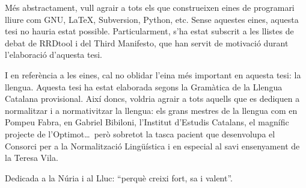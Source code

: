 Més abstractament, vull agrair a tots els que construeixen eines de
programari lliure com GNU, \LaTeX, Subversion, Python, etc. Sense
aquestes eines, aquesta tesi no hauria estat possible.
Particularment, s'ha estat subscrit a les llistes de debat de RRDtool
i del Third Manifesto, que han servit de motivació durant l'elaboració
d'aquesta tesi.


I en referència a les eines, cal no oblidar l'eina més important en
aquesta tesi: la llengua.  Aquesta tesi ha estat elaborada segons la
Gramàtica de la Llengua Catalana provisional. Així doncs, voldria
agrair a tots aquells que es dediquen a normalitzar i a normativitzar
la llengua: els grans mestres de la llengua com en Pompeu Fabra, en
Gabriel Bibiloni, l'Institut d'Estudis Catalans, el magnífic projecte
de l'Optimot\dots\ però sobretot la tasca pacient que desenvolupa el
Consorci per a la Normalització Lingüística i en especial al savi
ensenyament de la Teresa Vila.



Dedicada a la Núria i al Lluc: ``perquè creixi fort, sa i valent''.

  








